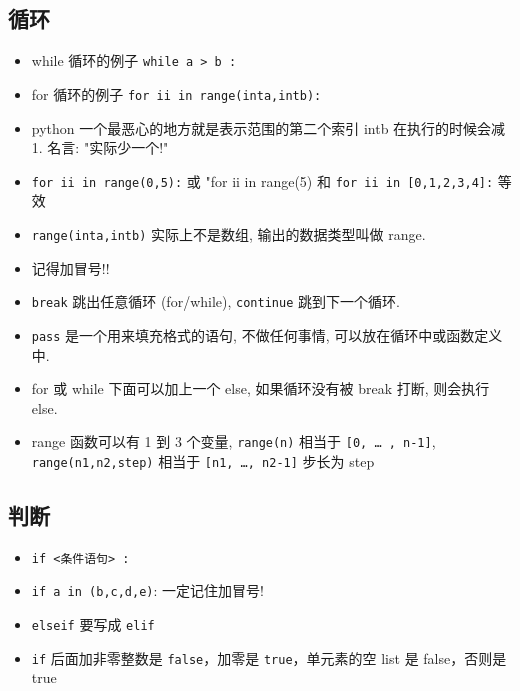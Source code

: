 \subsection{循环}
\begin{itemize}
\item while 循环的例子  \verb`while a > b :`
\item for 循环的例子 \verb`for ii in range(inta,intb):`
\item python 一个最恶心的地方就是表示范围的第二个索引 intb 在执行的时候会减 1.  名言: "实际少一个!"
\item \verb`for ii in range(0,5):` 或 "for ii in range(5) 和 \verb`for ii in [0,1,2,3,4]:` 等效
\item \verb`range(inta,intb)` 实际上不是数组, 输出的数据类型叫做 range.
\item 记得加冒号!!
\item \verb`break` 跳出任意循环 (for/while), \verb`continue` 跳到下一个循环.
\item \verb`pass` 是一个用来填充格式的语句, 不做任何事情, 可以放在循环中或函数定义中.
\item for 或 while 下面可以加上一个 else, 如果循环没有被 break 打断, 则会执行 else.
\item range 函数可以有 1 到 3 个变量, \verb`range(n)` 相当于 \verb`[0, … , n-1]`, \verb`range(n1,n2,step)` 相当于 \verb`[n1, …, n2-1]` 步长为 step 
\end{itemize}

\subsection{判断}
\begin{itemize}
\item \verb`if <条件语句> :`
\item \verb`if a in (b,c,d,e)`:   一定记住加冒号!
\item \verb`elseif` 要写成 \verb`elif`
\item \verb`if` 后面加非零整数是 \verb`false`，加零是 \verb`true`，单元素的空 list 是 false，否则是 true
\end{itemize}

